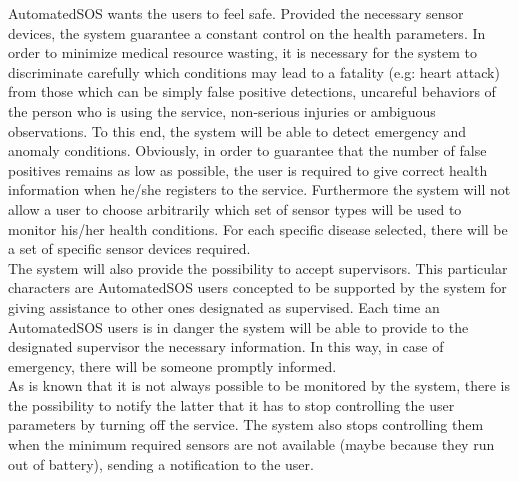 \newpage
{}
AutomatedSOS wants the users to feel safe. Provided the necessary sensor devices, the system guarantee a constant control on the health parameters. 
In order to minimize medical resource wasting, it is necessary for the system to discriminate carefully which conditions may lead to a fatality (e.g: heart attack) from those which can be simply false positive detections, uncareful behaviors of the person who is using the service, non-serious injuries or ambiguous observations. To this end, the system will be able to detect emergency and anomaly conditions.
Obviously, in order to guarantee that the number of false positives remains as low as possible, the user is required to give correct health information when he/she registers to the service. Furthermore the system will not allow a user to choose arbitrarily which set of sensor types will be used to monitor his/her health conditions. For each specific disease selected, there will be a set of specific sensor devices required.\\ 
The system will also provide the possibility to accept supervisors. This particular characters are AutomatedSOS users concepted to be supported by the system for giving assistance to other ones designated as supervised. Each time an AutomatedSOS users is in danger the system will be able to provide to the designated supervisor the necessary information. In this way, in case of emergency, there will be someone promptly informed.\\
As is known that it is not always possible to be monitored by the system, there is the possibility to notify the latter that it has to stop controlling the user parameters by turning off the service. The system also stops controlling them when the minimum required sensors are not available (maybe because they run out of battery), sending a notification to the user.  

